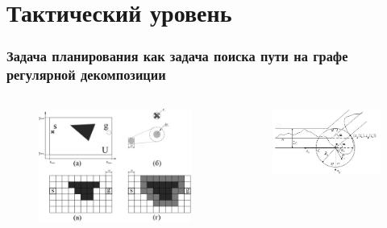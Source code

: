\documentclass[default]{beamer}
\begin{document}
	\section{Тактический уровень}
		
	\begin{frame}
		\frametitle{Задача планирования как задача поиска пути на графе регулярной декомпозиции}
		\begin{columns}
			\begin{column}{0.6\textwidth}
				\begin{figure}
					\includegraphics[width=\textwidth]{plan_1.jpg}
				\end{figure}
			\end{column}
			\begin{column}{0.4\textwidth}
				\begin{figure}
					\includegraphics[width=\textwidth]{plan_2.jpg}

\end{figure}
\end{column}
\end{columns}
\end{frame}
\end{document}
